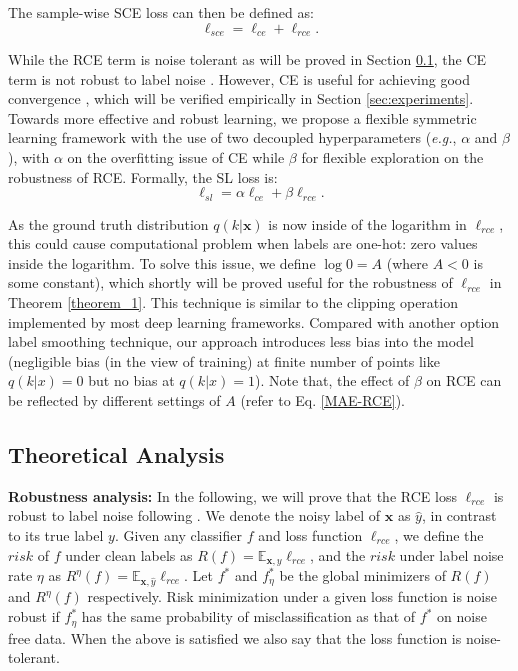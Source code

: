 \documentclass[10pt,twocolumn,letterpaper]{article}
\newcommand{\E}{\mathbb{E}}
\def \xx {\mathbf{x}}
\begin{document}
The sample-wise SCE loss can then be defined as:
\begin{equation}\label{eq:sce}
  \ell_{sce} = \ell_{ce} + \ell_{rce}.
\end{equation}

While the RCE term is noise tolerant as will be proved in Section \ref{sec:theor}, the CE term is not robust to label noise \cite{ghosh2017robust}. However, CE is useful for achieving good convergence \cite{zhang2018generalized}, which will be verified empirically in Section \ref{sec:experiments}. 
Towards more effective and robust learning, we propose a flexible symmetric learning framework with the use of two decoupled hyperparameters (\textit{e.g.}, $\alpha$ and $\beta$), with $\alpha$ on the overfitting issue of CE while $\beta$ for flexible exploration on the robustness of RCE. Formally, the SL loss is:
\begin{equation}\label{eq:sce_alpha}
\ell_{sl} = \alpha \ell_{ce} + \beta \ell_{rce}.
\end{equation}

As the ground truth distribution $q(k|\xx)$ is now inside of the logarithm in $\ell_{rce}$, this could cause computational problem when labels are one-hot: zero values inside the logarithm. To solve this issue, we define $\log 0 = A$ (where $A<0$ is some constant), which shortly will be proved useful for the robustness of $\ell_{rce}$ in Theorem \ref{theorem_1}.
This technique is similar to the clipping operation implemented by most deep learning frameworks. Compared with another option label smoothing technique, our approach introduces less bias into the model (negligible bias (in the view of training) at finite number of points like $q(k|x)=0$ but no bias at $q(k|x)=1$). Note that, the effect of $\beta$ on RCE can be reflected by different settings of $A$ (refer to Eq. \eqref{MAE-RCE}).

\subsection{Theoretical Analysis}\label{sec:theor}
\noindent\textbf{Robustness analysis:}
In the following, we will prove that the RCE loss $\ell_{rce}$ is robust to label noise following \cite{ghosh2017robust}. We denote the noisy label of $\xx$ as $\hat{y}$, in contrast to its true label $y$. Given any classifier $f$ and loss function $\ell_{rce}$, we define the $risk$ of $f$ under clean labels as $R(f)=\E_{\xx,y}\ell_{rce}$, and the $risk$ under label noise rate $\eta$ as $R^{\eta}(f)=\E_{\xx, \hat{y}} \ell_{rce}$. Let $f^*$ and $f_{\eta}^*$ be the global minimizers of $R(f)$ and $R^{\eta}(f)$ respectively. Risk minimization under a given loss function is noise robust if $f_{\eta}^*$ has the same probability of misclassification as that of $f^*$ on noise free data. When the above is satisfied we also say that the loss function is noise-tolerant.
\end{document}
